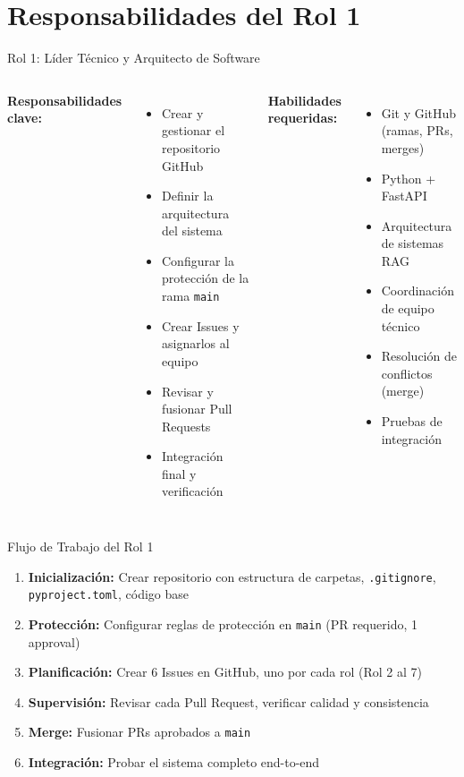\documentclass[aspectratio=169, 11pt]{beamer}
\begin{document}
\section{Responsabilidades del Rol 1}

\begin{frame}{Rol 1: Líder Técnico y Arquitecto de Software}
\begin{columns}[T]
\textbf{Responsabilidades clave:}
\begin{itemize}
    \item Crear y gestionar el repositorio GitHub
    \item Definir la arquitectura del sistema
    \item Configurar la protección de la rama \texttt{main}
    \item Crear Issues y asignarlos al equipo
    \item Revisar y fusionar Pull Requests
    \item Integración final y verificación
\end{itemize}

\textbf{Habilidades requeridas:}
\begin{itemize}
    \item Git y GitHub (ramas, PRs, merges)
    \item Python + FastAPI
    \item Arquitectura de sistemas RAG
    \item Coordinación de equipo técnico
    \item Resolución de conflictos (merge)
    \item Pruebas de integración
\end{itemize}
\end{columns}
\end{frame}

\begin{frame}{Flujo de Trabajo del Rol 1}
\begin{enumerate}
    \item \textbf{Inicialización:} Crear repositorio con estructura de carpetas, \texttt{.gitignore}, \texttt{pyproject.toml}, código base
    \item \textbf{Protección:} Configurar reglas de protección en \texttt{main} (PR requerido, 1 approval)
    \item \textbf{Planificación:} Crear 6 Issues en GitHub, uno por cada rol (Rol 2 al 7)
    \item \textbf{Supervisión:} Revisar cada Pull Request, verificar calidad y consistencia
    \item \textbf{Merge:} Fusionar PRs aprobados a \texttt{main}
    \item \textbf{Integración:} Probar el sistema completo end-to-end
\end{enumerate}
\end{frame}
\end{document}
